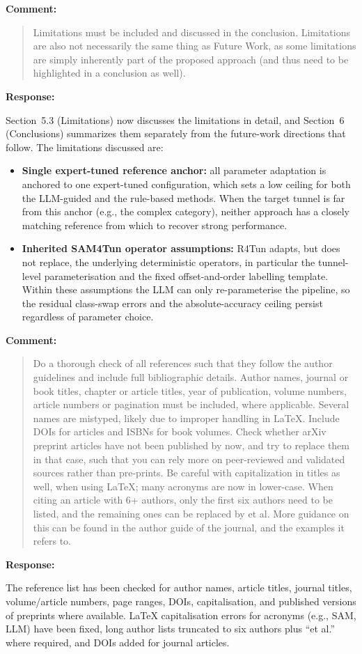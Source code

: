 \documentclass[11pt,a4paper]{article}
\newenvironment{commentblock}{%
  \par\smallskip\noindent\textbf{Comment:}\par
  \begin{quote}\itshape\color{black}
}{%
  \end{quote}\smallskip
}
\newenvironment{responseblock}{%
  \par\smallskip\noindent\textbf{Response:}\par
  \begingroup\color{responsegreen}
}{%
  \endgroup\smallskip
}
\begin{document}
\begin{commentblock}
Limitations must be included and discussed in the conclusion. Limitations are also not necessarily the same thing as Future Work, as some limitations are simply inherently part of the proposed approach (and thus need to be highlighted in a conclusion as well).
\end{commentblock}


\begin{responseblock}
Section~5.3 (Limitations) now discusses the limitations in detail, and Section~6 (Conclusions) summarizes them separately from the future-work directions that follow. The limitations discussed are:
\begin{itemize}[nosep]
  \item \textbf{Single expert-tuned reference anchor:} all parameter adaptation is anchored to one expert-tuned configuration, which sets a low ceiling for both the LLM-guided and the rule-based methods. When the target tunnel is far from this anchor (e.g., the complex category), neither approach has a closely matching reference from which to recover strong performance.
  \item \textbf{Inherited SAM4Tun operator assumptions:} R4Tun adapts, but does not replace, the underlying deterministic operators, in particular the tunnel-level parameterisation and the fixed offset-and-order labelling template. Within these assumptions the LLM can only re-parameterise the pipeline, so the residual class-swap errors and the absolute-accuracy ceiling persist regardless of parameter choice.
\end{itemize}
\end{responseblock}

\begin{commentblock}
Do a thorough check of all references such that they follow the author guidelines and include full bibliographic details. Author names, journal or book titles, chapter or article titles, year of publication, volume numbers, article numbers or pagination must be included, where applicable. Several names are mistyped, likely due to improper handling in \LaTeX. Include DOIs for articles and ISBNs for book volumes. Check whether arXiv preprint articles have not been published by now, and try to replace them in that case, such that you can rely more on peer-reviewed and validated sources rather than pre-prints. Be careful with capitalization in titles as well, when using \LaTeX; many acronyms are now in lower-case. When citing an article with 6+ authors, only the first six authors need to be listed, and the remaining ones can be replaced by et al. More guidance on this can be found in the author guide of the journal, and the examples it refers to.
\end{commentblock}
\begin{responseblock}
The reference list has been checked for author names, article titles, journal titles, volume/article numbers, page ranges, DOIs, capitalisation, and published versions of preprints where available. \LaTeX{} capitalisation errors for acronyms (e.g., SAM, LLM) have been fixed, long author lists truncated to six authors plus ``et al.'' where required, and DOIs added for journal articles.
\end{responseblock}
\end{document}
